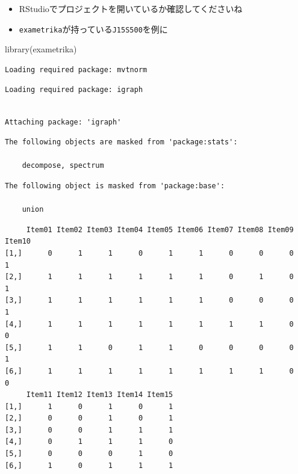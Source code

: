 \documentclass[
  a4paper,
]{ltjsbook}
\newenvironment{Shaded}{\begin{snugshade}}{\end{snugshade}}
\newcommand{\FunctionTok}[1]{\textcolor[rgb]{0.28,0.35,0.67}{#1}}
\newcommand{\NormalTok}[1]{\textcolor[rgb]{0.00,0.23,0.31}{#1}}
\newcommand{\OtherTok}[1]{\textcolor[rgb]{0.00,0.23,0.31}{#1}}
\newcommand{\SpecialCharTok}[1]{\textcolor[rgb]{0.37,0.37,0.37}{#1}}
\providecommand{\tightlist}{%
  \setlength{\itemsep}{0pt}\setlength{\parskip}{0pt}}\usepackage{longtable,booktabs,array}
\begin{document}
\begin{itemize}
\tightlist
\item
  RStudioでプロジェクトを開いているか確認してくださいね
\item
  \texttt{exametrika}が持っている\texttt{J15S500}を例に
\end{itemize}

\begin{Shaded}
\begin{Highlighting}[]
\FunctionTok{library}\NormalTok{(exametrika)}
\end{Highlighting}
\end{Shaded}

\begin{verbatim}
Loading required package: mvtnorm
\end{verbatim}

\begin{verbatim}
Loading required package: igraph
\end{verbatim}

\begin{verbatim}

Attaching package: 'igraph'
\end{verbatim}

\begin{verbatim}
The following objects are masked from 'package:stats':

    decompose, spectrum
\end{verbatim}

\begin{verbatim}
The following object is masked from 'package:base':

    union
\end{verbatim}

\begin{Shaded}
\end{Shaded}

\begin{verbatim}
     Item01 Item02 Item03 Item04 Item05 Item06 Item07 Item08 Item09 Item10
[1,]      0      1      1      0      1      1      0      0      0      1
[2,]      1      1      1      1      1      1      0      1      0      1
[3,]      1      1      1      1      1      1      0      0      0      1
[4,]      1      1      1      1      1      1      1      1      0      0
[5,]      1      1      0      1      1      0      0      0      0      1
[6,]      1      1      1      1      1      1      1      1      0      0
     Item11 Item12 Item13 Item14 Item15
[1,]      1      0      1      0      1
[2,]      0      0      1      0      1
[3,]      0      0      1      1      1
[4,]      0      1      1      1      0
[5,]      0      0      0      1      0
[6,]      1      0      1      1      1
\end{verbatim}
\end{document}
